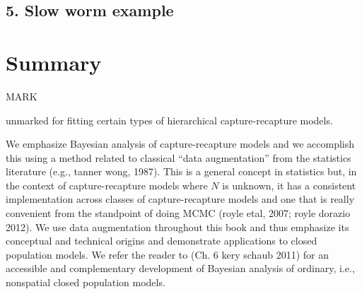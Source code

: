 \documentclass{book}
\begin{document}
\subsection*{5. Slow worm example}






\section{Summary}


MARK

unmarked for fitting certain types of hierarchical capture-recapture
models.

We emphasize Bayesian analysis of capture-recapture models and we
accomplish this using a method related to classical ``data
augmentation'' from the statistics literature (e.g., tanner wong, 1987).  This is a general concept in
statistics but, in the context of capture-recapture models where $N$
is unknown, it has a consistent implementation across classes of
capture-recapture models and one that is really convenient from the
standpoint of doing MCMC
(royle etal, 2007; royle dorazio 2012). We use data augmentation
throughout this book and thus emphasize its conceptual and technical
origins and demonstrate applications to closed population models.  We
refer the reader to (Ch. 6 kery schaub 2011) for an
accessible and complementary development of Bayesian analysis of
ordinary, i.e., nonspatial closed population models.
\end{document}
